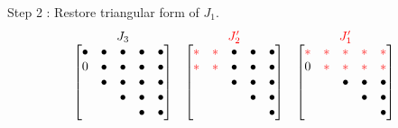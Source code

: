\begin{frame}
   {\color{green} Step 2} :
   Restore triangular form of $J_1$.
   \[
   \begin{matrix}
     J_3 & {\color{red} J'_2} &  {\color{red} J'_1} \\
     \begin{bmatrix}
       \uch & \uch & \uch & \uch & \uch \\
       0 & \uch & \uch & \uch & \uch \\
       & \uch & \uch & \uch & \uch \\
       & & \uch & \uch & \uch \\
       & & & \uch & \uch \\
     \end{bmatrix}
     &
     \begin{bmatrix}
       \ch & \ch & \uch & \uch & \uch \\
       \ch & \ch & \uch & \uch & \uch \\
       & & \uch & \uch & \uch \\
       & & & \uch & \uch \\
       & & & & \uch \\
     \end{bmatrix}
     &
     \begin{bmatrix}
       \ch & \ch & \ch & \ch & \ch \\
       0 & \ch & \ch & \ch & \ch \\
       & & \uch & \uch & \uch \\
       & & & \uch & \uch \\
       & & & & \uch \\
     \end{bmatrix}
   \end{matrix}
   \]
 \end{frame}

